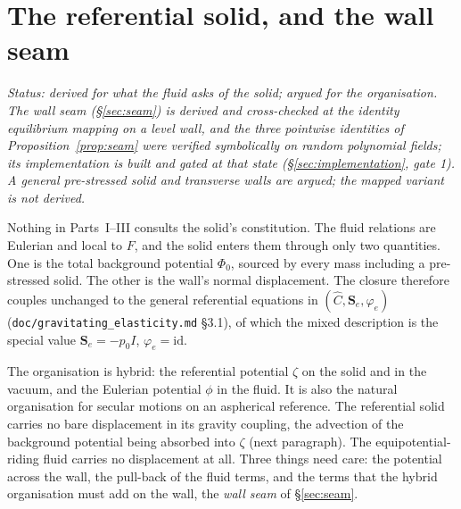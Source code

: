 \documentclass[11pt]{article}
\theoremstyle{definition}
\theoremstyle{remark}
\newcommand{\code}[1]{\texttt{#1}}
\newcommand{\Se}{\mathbf{S}_e}
\begin{document}
\section{The referential solid, and the wall seam}
\label{sec:solid}
\label{sec:prestress}

\emph{Status: derived for what the fluid asks of the solid; argued for
the organisation. The wall seam (\S\ref{sec:seam}) is derived and
cross-checked at the identity equilibrium mapping on a level wall, and
the three pointwise identities of Proposition~\ref{prop:seam} were
verified symbolically on random polynomial fields; its implementation is built and gated at
that state (\S\ref{sec:implementation}, gate 1). A general pre-stressed
solid and transverse walls are argued; the mapped variant is not
derived.}

Nothing in Parts~I--III consults the solid's constitution. The fluid relations are Eulerian and local to
$F$, and the solid enters them through only two quantities. One is the
total background potential $\Phi_0$, sourced by every mass including a
pre-stressed solid. The other is the wall's normal displacement. The
closure therefore couples unchanged to the general referential
equations in $(\hat C, \Se, \varphi_e)$
(\code{doc/gravitating\_elasticity.md} \S3.1), of which the mixed
description is the special value $\Se = -p_0 I$, $\varphi_e =
\mathrm{id}$.

The organisation is hybrid: the referential potential $\zeta$ on the
solid and in the vacuum, and the Eulerian potential $\phi$ in the
fluid. It is also the natural organisation for secular motions on an
aspherical reference. The referential solid carries no bare
displacement in its gravity coupling, the advection of the background
potential being absorbed into $\zeta$ (next paragraph). The
equipotential-riding fluid carries no displacement at all. Three
things need care: the potential across the wall, the pull-back of the
fluid terms, and the terms that the hybrid organisation must add on
the wall, the \emph{wall seam} of \S\ref{sec:seam}.
\end{document}
